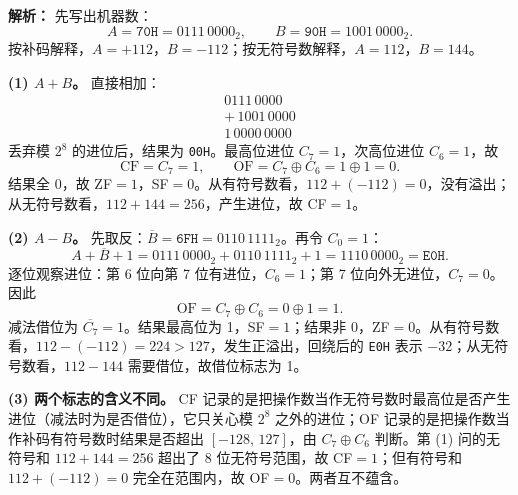 \begin{enumerate}[resume]
\ifshowsolutions\par\noindent\textbf{解析：} 先写出机器数：
\[
A=\texttt{70H}=0111\,0000_2,\qquad
B=\texttt{90H}=1001\,0000_2.
\]
按补码解释，$A=+112$，$B=-112$；按无符号数解释，$A=112$，$B=144$。

\textbf{(1) $A+B$。} 直接相加：
\[
\begin{array}{r}
0111\,0000\\
+\,1001\,0000\\ \hline
1\,0000\,0000
\end{array}
\]
丢弃模 $2^8$ 的进位后，结果为 \texttt{00H}。最高位进位 $C_7=1$，次高位进位 $C_6=1$，故
\[
\text{CF}=C_7=1,\qquad \text{OF}=C_7\oplus C_6=1\oplus1=0.
\]
结果全 0，故 ZF$=1$，SF$=0$。从有符号数看，$112+(-112)=0$，没有溢出；从无符号数看，$112+144=256$，产生进位，故 CF$=1$。

\textbf{(2) $A-B$。} 先取反：$\overline{B}=\texttt{6FH}=0110\,1111_2$。再令 $C_0=1$：
\[
A+\overline{B}+1
=0111\,0000_2+0110\,1111_2+1
=1110\,0000_2=\texttt{E0H}.
\]
逐位观察进位：第 6 位向第 7 位有进位，$C_6=1$；第 7 位向外无进位，$C_7=0$。因此
\[
\text{OF}=C_7\oplus C_6=0\oplus1=1.
\]
减法借位为 $\overline{C_7}=1$。结果最高位为 1，SF$=1$；结果非 0，ZF$=0$。从有符号数看，$112-(-112)=224>127$，发生正溢出，回绕后的 \texttt{E0H} 表示 $-32$；从无符号数看，$112-144$ 需要借位，故借位标志为 1。

\textbf{(3) 两个标志的含义不同。} CF 记录的是把操作数当作无符号数时最高位是否产生进位（减法时为是否借位），它只关心模 $2^8$ 之外的进位；OF 记录的是把操作数当作补码有符号数时结果是否超出 $[-128,\,127]$，由 $C_7\oplus C_6$ 判断。第 (1) 问的无符号和 $112+144=256$ 超出了 8 位无符号范围，故 CF$=1$；但有符号和 $112+(-112)=0$ 完全在范围内，故 OF$=0$。两者互不蕴含。

\else \answerarea[10] \fi

\end{enumerate}
